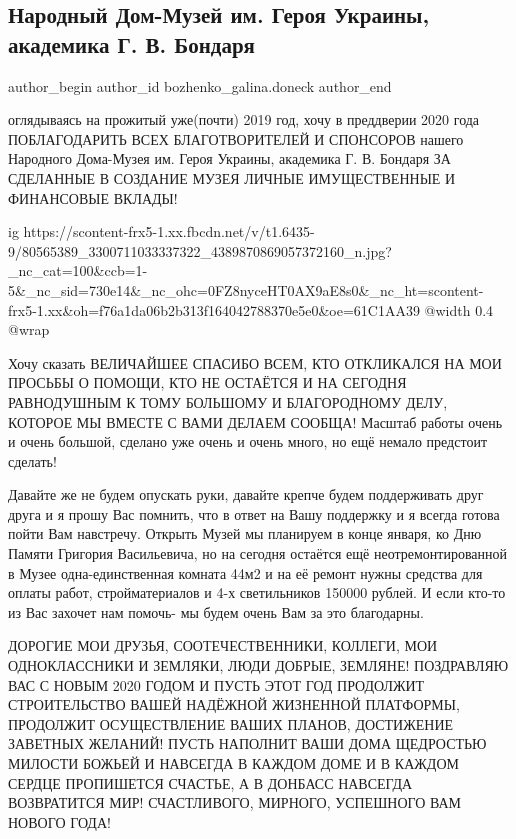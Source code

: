  
 
 
 
 
 
\subsection{Народный Дом-Музей им. Героя Украины, академика Г. В. Бондаря}
\label{sec:28_12_2019.fb.bozhenko_galina.doneck.1.dom_muzej_im_bondarja}
 
\ifcmt
 author_begin
   author_id bozhenko_galina.doneck
 author_end
\fi

оглядываясь на прожитый уже(почти) 2019 год, хочу в преддверии 2020 года
ПОБЛАГОДАРИТЬ ВСЕХ БЛАГОТВОРИТЕЛЕЙ И СПОНСОРОВ нашего Народного Дома-Музея
им. Героя Украины, академика Г. В. Бондаря ЗА СДЕЛАННЫЕ В СОЗДАНИЕ МУЗЕЯ ЛИЧНЫЕ
ИМУЩЕСТВЕННЫЕ И ФИНАНСОВЫЕ ВКЛАДЫ! 

\ifcmt
  ig https://scontent-frx5-1.xx.fbcdn.net/v/t1.6435-9/80565389_3300711033337322_4389870869057372160_n.jpg?_nc_cat=100&ccb=1-5&_nc_sid=730e14&_nc_ohc=0FZ8nyceHT0AX9aE8s0&_nc_ht=scontent-frx5-1.xx&oh=f76a1da06b2b313f164042788370e5e0&oe=61C1AA39
  @width 0.4
  @wrap 
\fi


Хочу сказать ВЕЛИЧАЙШЕЕ СПАСИБО ВСЕМ, КТО
ОТКЛИКАЛСЯ НА МОИ ПРОСЬБЫ О ПОМОЩИ, КТО НЕ ОСТАЁТСЯ И НА СЕГОДНЯ РАВНОДУШНЫМ К
ТОМУ БОЛЬШОМУ И БЛАГОРОДНОМУ ДЕЛУ, КОТОРОЕ МЫ ВМЕСТЕ С ВАМИ ДЕЛАЕМ СООБЩА!
Масштаб работы очень и очень большой, сделано уже очень и очень много, но ещё
немало предстоит сделать! 

Давайте же не будем опускать руки, давайте крепче
будем поддерживать друг друга и я прошу Вас помнить, что в ответ на Вашу
поддержку и я всегда готова пойти Вам навстречу. Открыть Музей мы планируем в
конце января, ко Дню Памяти Григория Васильевича, но на сегодня остаётся ещё
неотремонтированной в Музее одна-единственная комната 44м2 и на её ремонт нужны
средства для оплаты работ, стройматериалов и 4-х светильников 150000 рублей. И
если кто-то из Вас захочет нам помочь- мы будем очень Вам за это благодарны.

ДОРОГИЕ МОИ ДРУЗЬЯ, СООТЕЧЕСТВЕННИКИ, КОЛЛЕГИ, МОИ ОДНОКЛАССНИКИ И ЗЕМЛЯКИ,
ЛЮДИ ДОБРЫЕ, ЗЕМЛЯНЕ! ПОЗДРАВЛЯЮ ВАС С НОВЫМ 2020 ГОДОМ И ПУСТЬ ЭТОТ ГОД
ПРОДОЛЖИТ СТРОИТЕЛЬСТВО ВАШЕЙ НАДЁЖНОЙ ЖИЗНЕННОЙ ПЛАТФОРМЫ, ПРОДОЛЖИТ
ОСУЩЕСТВЛЕНИЕ ВАШИХ ПЛАНОВ, ДОСТИЖЕНИЕ ЗАВЕТНЫХ ЖЕЛАНИЙ! ПУСТЬ НАПОЛНИТ ВАШИ
ДОМА ЩЕДРОСТЬЮ МИЛОСТИ БОЖЬЕЙ И НАВСЕГДА В КАЖДОМ ДОМЕ И В КАЖДОМ СЕРДЦЕ
ПРОПИШЕТСЯ СЧАСТЬЕ, А В ДОНБАСС НАВСЕГДА ВОЗВРАТИТСЯ МИР! СЧАСТЛИВОГО,
МИРНОГО, УСПЕШНОГО ВАМ НОВОГО ГОДА!

